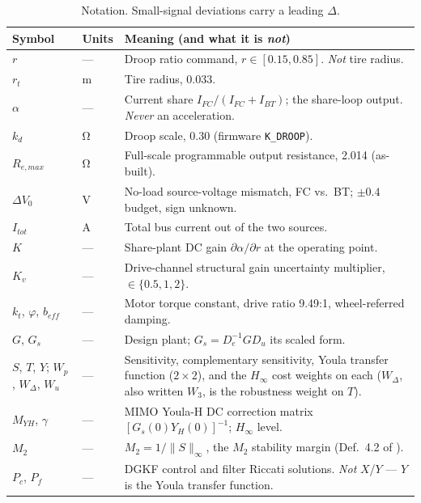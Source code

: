 \documentclass[energies,article,submit,pdftex,oneauthor]{Definitions/mdpi}
\begin{document}
\begin{table}[H]
\caption{Notation. Small-signal deviations carry a leading $\Delta$.}
\label{tab:notation}
\begin{tabularx}{\textwidth}{llX}
\toprule
\textbf{Symbol} & \textbf{Units} & \textbf{Meaning (and what it is \emph{not})} \\
\midrule
$r$ & --- & Droop ratio command, $r\in[0.15,0.85]$. \emph{Not} tire radius. \\
$r_t$ & \si{\meter} & Tire radius, \num{0.033}. \\
$\alpha$ & --- & Current share $I_{FC}/(I_{FC}+I_{BT})$; the share-loop output. \emph{Never} an acceleration. \\
$k_d$ & \si{\ohm} & Droop scale, \num{0.30} (firmware \texttt{K\_DROOP}). \\
$R_{e,max}$ & \si{\ohm} & Full-scale programmable output resistance, \num{2.014} (as-built). \\
$\Delta V_0$ & \si{\volt} & No-load source-voltage mismatch, FC vs.\ BT; $\pm\num{0.4}$ budget, sign unknown. \\
$I_{tot}$ & \si{\ampere} & Total bus current out of the two sources. \\
$K$ & --- & Share-plant DC gain $\partial\alpha/\partial r$ at the operating point. \\
$K_v$ & --- & Drive-channel structural gain uncertainty multiplier, $\in\{0.5,1,2\}$. \\
$k_t$, $\varphi$, $b_{\!e\!f\!f}$ & --- & Motor torque constant, drive ratio \num{9.49}:1, wheel-referred damping. \\
$G$, $G_s$ & --- & Design plant; $G_s = D_e^{-1} G D_u$ its scaled form. \\
$S$, $T$, $Y$; $W_p$, $W_{\Delta}$, $W_u$ & --- & Sensitivity, complementary sensitivity, Youla transfer function ($2\times2$), and the $H_\infty$ cost weights on each ($W_{\Delta}$, also written $W_3$, is the robustness weight on $T$). \\
$M_{YH}$, $\gamma$ & --- & MIMO Youla-H DC correction matrix $[G_s(0)Y_H(0)]^{-1}$; $H_\infty$ level. \\
$M_2$ & --- & $M_2 = 1/\|S\|_\infty$, the $M_2$ stability margin (Def.~4.2 of \citep{assadian2020neoclassical}). \\
$P_c$, $P_f$ & --- & DGKF control and filter Riccati solutions. \emph{Not} $X$/$Y$ --- $Y$ is the Youla transfer function. \\
\bottomrule
\end{tabularx}
\end{table}
\end{document}
